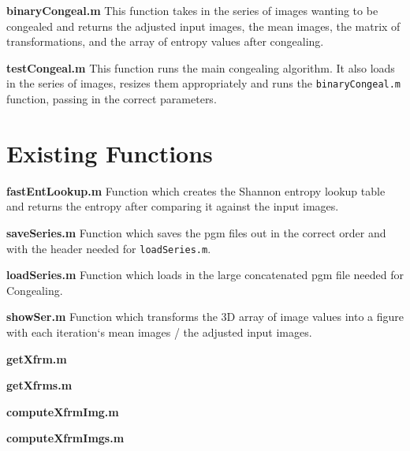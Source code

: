 \noindent \textbf{binaryCongeal.m}
This function takes in the series of images wanting to be congealed and returns the adjusted input images, the mean images, the matrix of transformations, and the array of entropy values after congealing.

\noindent \textbf{testCongeal.m}
This function runs the main congealing algorithm. It also loads in the series of images, resizes them appropriately and runs the \texttt{binaryCongeal.m} function, passing in the correct parameters.

\section{Existing Functions}

\noindent \textbf{fastEntLookup.m}
Function which creates the Shannon entropy lookup table and returns the entropy after comparing it against the input images.

\noindent \textbf{saveSeries.m}
Function which saves the pgm files out in the correct order and with the header needed for \texttt{loadSeries.m}.

\noindent \textbf{loadSeries.m}
Function which loads in the large concatenated pgm file needed for Congealing.

\noindent \textbf{showSer.m}
Function which transforms the 3D array of image values into a figure with each iteration`s mean images / the adjusted input images.

\noindent \textbf{getXfrm.m}

\noindent \textbf{getXfrms.m}

\noindent \textbf{computeXfrmImg.m}

\noindent \textbf{computeXfrmImgs.m}

